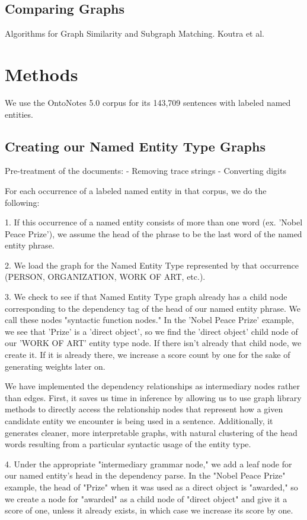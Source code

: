 \documentclass[11pt,a4paper]{article}
\begin{document}
\subsection{Comparing Graphs}
Algorithms for Graph Similarity and Subgraph Matching. Koutra et al.

\section{Methods} \label {methods}
We use the OntoNotes 5.0 corpus for its 143,709 sentences with labeled named entities.

\subsection{Creating our Named Entity Type Graphs} \label{construct_net}

Pre-treatment of the documents:
- Removing trace strings
- Converting digits

For each occurrence of a labeled named entity in that corpus, we do the following:

1. If this occurrence of a named entity consists of more than one word (ex. 'Nobel Peace Prize'), we assume the head of the phrase to be the last word of the named entity phrase.

2. We load the graph for the Named Entity Type represented by that occurrence (PERSON, ORGANIZATION, WORK OF ART, etc.).

3. We check to see if that Named Entity Type graph already has a child node corresponding to the dependency tag of the head of our named entity phrase. We call these nodes "syntactic function nodes."  In the 'Nobel Peace Prize' example, we see that 'Prize' is a 'direct object', so we find the 'direct object' child node of our 'WORK OF ART' entity type node. If there isn't already that child node, we create it. If it is already there, we increase a score count by one for the sake of generating weights later on.

We have implemented the dependency relationships as intermediary nodes rather than edges. First, it saves us time in inference by allowing us to use graph library methods to directly access the relationship nodes that represent how a given candidate entity we encounter is being used in a sentence. Additionally, it generates cleaner, more interpretable graphs, with natural clustering of the head words resulting from a particular syntactic usage of the entity type.

4. Under the appropriate "intermediary grammar node," we add a leaf node for our named entity's head in the dependency parse. In the "Nobel Peace Prize" example, the head of "Prize" when it was used as a direct object is "awarded," so we create a node for "awarded" as a child node of "direct object" and give it a score of one, unless it already exists, in which case we increase its score by one.
\end{document}
